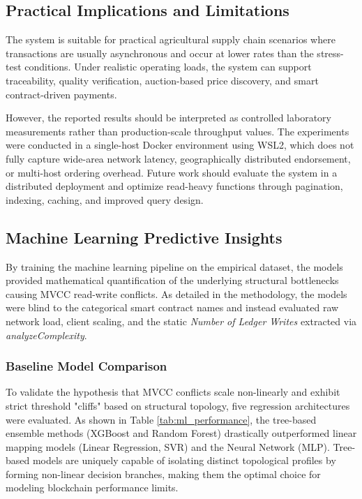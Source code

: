 \documentclass[manuscript,screen]{acmart}
\begin{document}
	\subsection{Practical Implications and Limitations}
	
	The system is suitable for practical agricultural supply chain scenarios where transactions are usually asynchronous and occur at lower rates than the stress-test conditions. Under realistic operating loads, the system can support traceability, quality verification, auction-based price discovery, and smart contract-driven payments.
	
	However, the reported results should be interpreted as controlled laboratory measurements rather than production-scale throughput values. The experiments were conducted in a single-host Docker environment using WSL2, which does not fully capture wide-area network latency, geographically distributed endorsement, or multi-host ordering overhead. Future work should evaluate the system in a distributed deployment and optimize read-heavy functions through pagination, indexing, caching, and improved query design.
	
	\subsection{Machine Learning Predictive Insights}
	
	By training the machine learning pipeline on the empirical dataset, the models provided mathematical quantification of the underlying structural bottlenecks causing MVCC read-write conflicts. As detailed in the methodology, the models were blind to the categorical smart contract names and instead evaluated raw network load, client scaling, and the static \textit{Number of Ledger Writes} extracted via \textit{analyzeComplexity}.
	
	\subsubsection{Baseline Model Comparison}
	To validate the hypothesis that MVCC conflicts scale non-linearly and exhibit strict threshold "cliffs" based on structural topology, five regression architectures were evaluated. As shown in Table \ref{tab:ml_performance}, the tree-based ensemble methods (XGBoost and Random Forest) drastically outperformed linear mapping models (Linear Regression, SVR) and the Neural Network (MLP). Tree-based models are uniquely capable of isolating distinct topological profiles by forming non-linear decision branches, making them the optimal choice for modeling blockchain performance limits.
	
\end{document}
